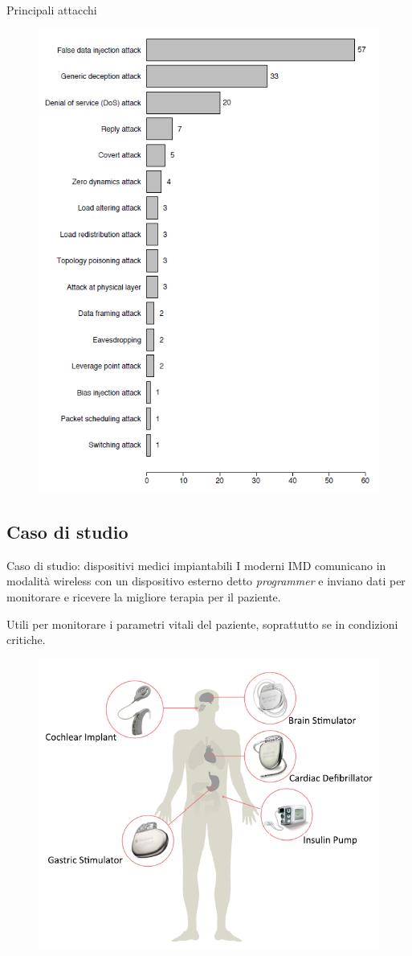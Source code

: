 \documentclass{beamer}
\begin{document}
\begin{frame}{Principali attacchi}
    \begin{center}
        \begin{figure}[H]
          \centering
          \includegraphics[width=0.5\linewidth]{img1.png}
        \end{figure}
    \end{center}
\end{frame}

\subsection{Caso di studio}
\begin{frame}{Caso di studio: dispositivi medici impiantabili}
    I moderni IMD comunicano in modalità wireless con un dispositivo esterno detto \textit{programmer} e inviano dati per monitorare e ricevere la migliore 
    terapia per il paziente. 
    
    Utili per monitorare i parametri vitali del paziente, soprattutto se in condizioni critiche.

    \begin{center}
        \begin{figure}[H]
          \centering
          \includegraphics[width=0.5\linewidth]{img2.png}
        \end{figure}
    \end{center}
\end{frame}
\end{document}
